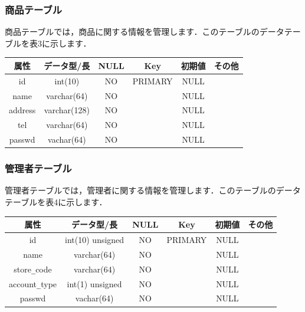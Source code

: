 \documentclass[a4j,titlepage]{jarticle}
\begin{document}
\subsubsection{商品テーブル}
商品テーブルでは，商品に関する情報を管理します．このテーブルのデータテーブルを表3に示します．
\begin{table}[htb]
  \begin{center}
    \begin{tabular}{|c|c|c|c|c|c|} \hline
      属性 & データ型/長 & NULL & Key & 初期値 & その他 \\ \hline \hline
      id & int(10) & NO & PRIMARY & NULL & \\ \hline
      name & varchar(64) & NO &   & NULL & \\ \hline
      address & varchar(128) & NO &   & NULL & \\ \hline
      tel & varchar(64) & NO &   & NULL & \\ \hline
      passwd & vachar(64) & NO &   & NULL & \\ \hline
    \end{tabular}
  \end{center}
\end{table}

\subsubsection{管理者テーブル}
管理者テーブルでは，管理者に関する情報を管理します．このテーブルのデータテーブルを表4に示します．
\begin{table}[htb]
  \begin{center}
    \begin{tabular}{|c|c|c|c|c|c|} \hline
      属性 & データ型/長 & NULL & Key & 初期値 & その他 \\ \hline \hline
      id & int(10) unsigned & NO & PRIMARY & NULL & \\ \hline
      name & varchar(64) & NO &   & NULL & \\ \hline
      store\verb|_|code & varchar(64) & NO &   & NULL & \\ \hline
      account\verb|_|type & int(1) unsigned & NO &   & NULL & \\ \hline
      passwd & vachar(64) & NO &   & NULL & \\ \hline
    \end{tabular}
  \end{center}
\end{table}
\end{document}
